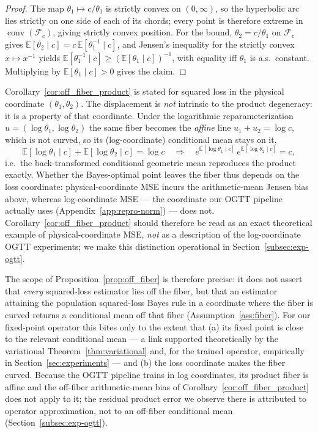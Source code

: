 \begin{proof}
The map $\theta_1\mapsto c/\theta_1$ is strictly convex on $(0,\infty)$, so the hyperbolic arc lies strictly on one side of each of its chords; every point is therefore extreme in $\operatorname{conv}(\mathcal{F}_c)$, giving strictly convex position. For the bound, $\theta_2=c/\theta_1$ on $\mathcal{F}_c$ gives $\mathbb{E}[\theta_2\mid c]=c\,\mathbb{E}[\theta_1^{-1}\mid c]$, and Jensen's inequality for the strictly convex $x\mapsto x^{-1}$ yields $\mathbb{E}[\theta_1^{-1}\mid c]\ge(\mathbb{E}[\theta_1\mid c])^{-1}$, with equality iff $\theta_1$ is a.s.\ constant. Multiplying by $\mathbb{E}[\theta_1\mid c]>0$ gives the claim.
\end{proof}

\begin{remark}
\label{rem:coordinate}
Corollary~\ref{cor:off_fiber_product} is stated for squared loss in the physical coordinate $(\theta_1,\theta_2)$. The displacement is \emph{not} intrinsic to the product degeneracy: it is a property of that coordinate. Under the logarithmic reparameterization $u=(\log\theta_1,\log\theta_2)$ the same fiber becomes the \emph{affine} line $u_1+u_2=\log c$, which is not curved, so its (log-coordinate) conditional mean stays on it,
\[
\mathbb{E}[\log\theta_1\mid c]+\mathbb{E}[\log\theta_2\mid c]=\log c
\quad\Longrightarrow\quad
e^{\mathbb{E}[\log\theta_1\mid c]}\,e^{\mathbb{E}[\log\theta_2\mid c]}=c,
\]
i.e.\ the back-transformed conditional geometric mean reproduces the product exactly. Whether the Bayes-optimal point leaves the fiber thus depends on the loss coordinate: physical-coordinate MSE incurs the arithmetic-mean Jensen bias above, whereas log-coordinate MSE --- the coordinate our OGTT pipeline actually uses (Appendix~\ref{app:repro-norm}) --- does not. Corollary~\ref{cor:off_fiber_product} should therefore be read as an exact theoretical example of physical-coordinate MSE, \emph{not} as a description of the log-coordinate OGTT experiments; we make this distinction operational in Section~\ref{subsec:exp-ogtt}.
\end{remark}

The scope of Proposition~\ref{prop:off_fiber} is therefore precise: it does not assert that \emph{every} squared-loss estimator lies off the fiber, but that an estimator attaining the population squared-loss Bayes rule in a coordinate where the fiber is curved returns a conditional mean off that fiber (Assumption~\ref{ass:fiber}). For our fixed-point operator this bites only to the extent that (a) its fixed point is close to the relevant conditional mean --- a link supported theoretically by the variational Theorem~\ref{thm:variational} and, for the trained operator, empirically in Section~\ref{sec:experiments} --- and (b) the loss coordinate makes the fiber curved. Because the OGTT pipeline trains in log coordinates, its product fiber is affine and the off-fiber arithmetic-mean bias of Corollary~\ref{cor:off_fiber_product} does not apply to it; the residual product error we observe there is attributed to operator approximation, not to an off-fiber conditional mean (Section~\ref{subsec:exp-ogtt}).

